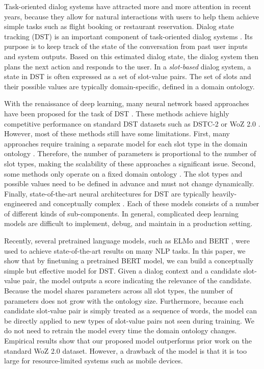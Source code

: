 Task-oriented dialog systems have attracted more and more attention in recent years, because they allow for natural interactions with users to help them achieve simple tasks such as flight booking or restaurant reservation. Dialog state tracking (DST) is an important component of task-oriented dialog systems \cite{Young2013POMDPBasedSS}. Its purpose is to keep track of the state of the conversation from past user inputs and system outputs. Based on this estimated dialog state, the dialog system then plans the next action and responds to the user. In a \textit{slot-based} dialog system, a state in DST is often expressed as a set of slot-value pairs. The set of slots and their possible values are typically domain-specific, defined in a domain ontology.


With the renaissance of deep learning, many neural network based approaches have been proposed for the task of DST \cite{Mrksic2016NeuralBT,Liu2017AnET,zhong-etal-2018-global,Ren2018TowardsUD,nouri2018toward,mrkvsic2018fully,Korpusik2019DialogueST,chao2019bert}. These methods achieve highly competitive performance on standard DST datasets such as DSTC-2 \cite{Henderson2014TheSD} or WoZ 2.0 \cite{Wen2016ANE}. However, most of these methods still have some limitations. First, many approaches require training a separate model for each slot type in the domain ontology \cite{Mrksic2016NeuralBT,zhong-etal-2018-global,mrkvsic2018fully}. Therefore, the number of parameters is proportional to the number of slot types, making the scalability of these approaches a significant issue. Second, some methods only operate on a fixed domain ontology \cite{Liu2017AnET,zhong-etal-2018-global}. The slot types and possible values need to be defined in advance and must not change dynamically. Finally, state-of-the-art neural architectures for DST are typically heavily-engineered and conceptually complex \cite{zhong-etal-2018-global,Ren2018TowardsUD,nouri2018toward,mrkvsic2018fully}. Each of these models consists of a number of different kinds of sub-components. In general, complicated deep learning models are difficult to implement, debug, and maintain in a production setting.

Recently, several pretrained language models, such as ELMo \cite{Peters:2018} and BERT \cite{Devlin2019BERTPO}, were used to achieve state-of-the-art results on many NLP tasks. In this paper, we show that by finetuning a pretrained BERT model, we can build a conceptually simple but effective model for DST. Given a dialog context and a candidate slot-value pair, the model outputs a score indicating the relevance of the candidate. Because the model shares parameters across all slot types, the number of parameters does not grow with the ontology size. Furthermore, because each candidate slot-value pair is simply treated as a sequence of words, the model can be directly applied to new types of slot-value pairs not seen during training. We do not need to retrain the model every time the domain ontology changes. Empirical results show that our proposed model outperforms prior work on the standard WoZ 2.0 dataset. However, a drawback of the model is that it is too large for resource-limited systems such as mobile devices.

